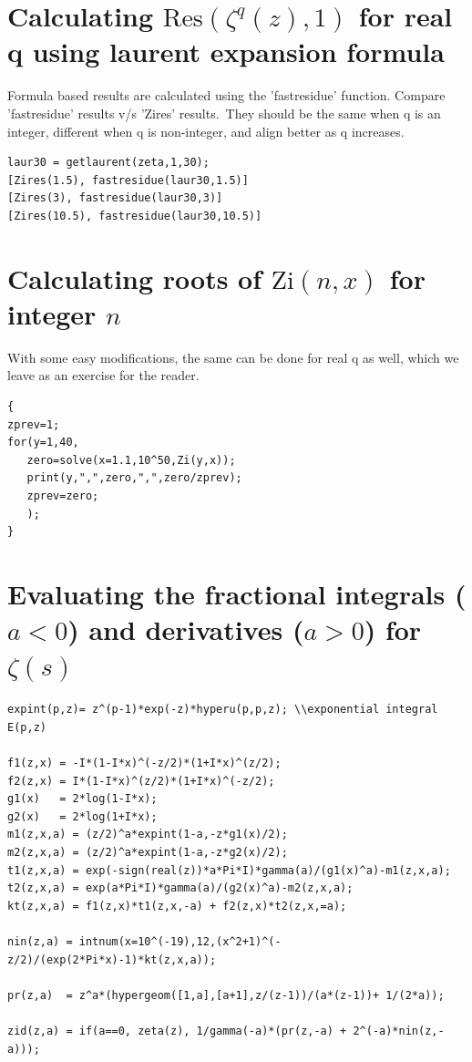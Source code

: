 \documentclass[a4paper,11pt,twoside]{amsart}
\newcommand\Zi{\mathrm{Zi}}
\newcommand\Res{\mathrm{Res}}
\begin{document}
\section{Calculating $\Res(\zeta^{q}(z), 1)$ for real q using laurent expansion formula}
Formula based results are calculated using the 'fastresidue' function. Compare 'fastresidue' results v/s 'Zires' results.\
They should be the same when q is an integer, different when q is non-integer, and align better as q increases.

\begin{verbatim}
laur30 = getlaurent(zeta,1,30);
[Zires(1.5), fastresidue(laur30,1.5)]
[Zires(3), fastresidue(laur30,3)]
[Zires(10.5), fastresidue(laur30,10.5)]
\end{verbatim}


\section{Calculating roots of $\Zi(n,x)$ for integer $n$}
With some easy modifications, the same can be done for real q as well, which we leave as an exercise for the reader.

\begin{verbatim}
{
zprev=1;
for(y=1,40,
   zero=solve(x=1.1,10^50,Zi(y,x));
   print(y,",",zero,",",zero/zprev);
   zprev=zero;
   );
}   
\end{verbatim}


\section{Evaluating the fractional integrals ($a <0$) and derivatives ($a > 0$) for $\zeta(s)$}

\begin{verbatim}
expint(p,z)= z^(p-1)*exp(-z)*hyperu(p,p,z); \\exponential integral E(p,z)

f1(z,x) = -I*(1-I*x)^(-z/2)*(1+I*x)^(z/2);
f2(z,x) = I*(1-I*x)^(z/2)*(1+I*x)^(-z/2);
g1(x)   = 2*log(1-I*x);
g2(x)   = 2*log(1+I*x);
m1(z,x,a) = (z/2)^a*expint(1-a,-z*g1(x)/2);
m2(z,x,a) = (z/2)^a*expint(1-a,-z*g2(x)/2);
t1(z,x,a) = exp(-sign(real(z))*a*Pi*I)*gamma(a)/(g1(x)^a)-m1(z,x,a);
t2(z,x,a) = exp(a*Pi*I)*gamma(a)/(g2(x)^a)-m2(z,x,a);
kt(z,x,a) = f1(z,x)*t1(z,x,-a) + f2(z,x)*t2(z,x,=a);

nin(z,a) = intnum(x=10^(-19),12,(x^2+1)^(-z/2)/(exp(2*Pi*x)-1)*kt(z,x,a));

pr(z,a)  = z^a*(hypergeom([1,a],[a+1],z/(z-1))/(a*(z-1))+ 1/(2*a));

zid(z,a) = if(a==0, zeta(z), 1/gamma(-a)*(pr(z,-a) + 2^(-a)*nin(z,-a)));
\end{verbatim}
\end{document}
